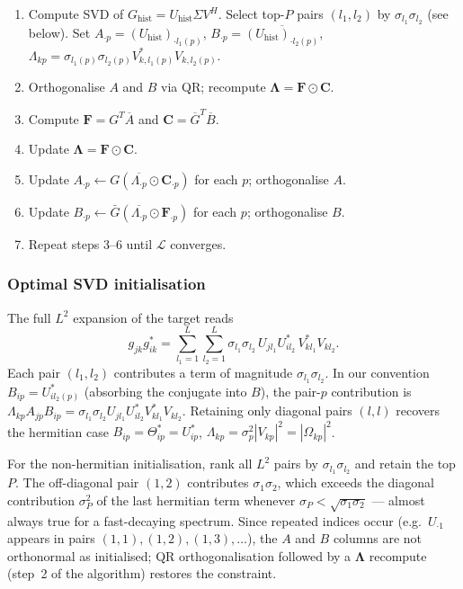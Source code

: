 \documentclass{article}
\begin{document}
\begin{enumerate}[label=\arabic*.]
    \item Compute SVD of $G_{\mathrm{hist}} = U_{\mathrm{hist}}\Sigma V^H$.
          Select top-$P$ pairs $(l_1,l_2)$ by $\sigma_{l_1}\sigma_{l_2}$ (see below).
          Set $A_{\cdot p} = (U_{\mathrm{hist}})_{\cdot l_1(p)}$,
          $B_{\cdot p} = \overline{(U_{\mathrm{hist}})_{\cdot l_2(p)}}$,
          $\Lambda_{kp} = \sigma_{l_1(p)}\sigma_{l_2(p)}V^*_{k,l_1(p)}V_{k,l_2(p)}$.
    \item Orthogonalise $A$ and $B$ via QR; recompute $\boldsymbol{\Lambda} = \mathbf{F}\odot\mathbf{C}$.
    \item Compute $\mathbf{F} = G^T\overline{A}$ and $\mathbf{C} = \overline{G}^T\overline{B}$.
    \item Update $\boldsymbol{\Lambda} = \mathbf{F}\odot\mathbf{C}$.
    \item Update $A_{\cdot p} \leftarrow G(\overline{\Lambda_{\cdot p}}\odot\mathbf{C}_{\cdot p})$ for each $p$; orthogonalise $A$.
    \item Update $B_{\cdot p} \leftarrow \bar{G}(\overline{\Lambda_{\cdot p}}\odot\mathbf{F}_{\cdot p})$ for each $p$; orthogonalise $B$.
    \item Repeat steps 3--6 until $\mathcal{L}$ converges.
\end{enumerate}

\subsubsection*{Optimal SVD initialisation}

The full $L^2$ expansion of the target reads
\begin{equation}
    g_{jk}g^*_{ik}
    = \sum_{l_1=1}^L\sum_{l_2=1}^L
      \sigma_{l_1}\sigma_{l_2}\,U_{jl_1}U^*_{il_2}\,V^*_{kl_1}V_{kl_2}.
    \label{eq:full_expansion}
\end{equation}
Each pair $(l_1, l_2)$ contributes a term of magnitude $\sigma_{l_1}\sigma_{l_2}$.
In our convention $B_{ip} = U^*_{il_2(p)}$ (absorbing the conjugate into $B$),
the pair-$p$ contribution is $\Lambda_{kp}A_{jp}B_{ip} = \sigma_{l_1}\sigma_{l_2}U_{jl_1}U^*_{il_2}V^*_{kl_1}V_{kl_2}$.
Retaining only diagonal pairs $(l,l)$ recovers the hermitian case
$B_{ip}=\Theta^*_{ip}=U^*_{ip}$, $\Lambda_{kp}=\sigma_p^2|V_{kp}|^2=|\Omega_{kp}|^2$.

For the non-hermitian initialisation, rank all $L^2$ pairs by $\sigma_{l_1}\sigma_{l_2}$
and retain the top $P$.
The off-diagonal pair $(1,2)$ contributes $\sigma_1\sigma_2$, which exceeds the diagonal
contribution $\sigma_P^2$ of the last hermitian term whenever
$\sigma_P < \sqrt{\sigma_1\sigma_2}$ — almost always true for a fast-decaying spectrum.
Since repeated indices occur (e.g.\ $U_{\cdot 1}$ appears in pairs $(1,1),(1,2),(1,3),\ldots$),
the $A$ and $B$ columns are not orthonormal as initialised; QR orthogonalisation followed
by a $\boldsymbol{\Lambda}$ recompute (step~2 of the algorithm) restores the constraint.
\end{document}

